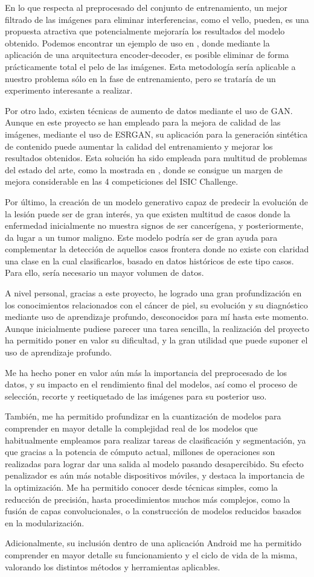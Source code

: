 En lo que respecta al preprocesado del conjunto de entrenamiento, un mejor filtrado de las imágenes para eliminar interferencias, como el vello,  pueden, es una propuesta atractiva que potencialmente mejoraría los resultados del modelo obtenido. Podemos encontrar un ejemplo de uso en \cite{9306830}, donde mediante la aplicación de una arquitectura encoder-decoder, es posible eliminar de forma prácticamente total el pelo de las imágenes. Esta metodología sería aplicable a nuestro problema sólo en la fase de entrenamiento, pero se trataría de un experimento interesante a realizar.

Por otro lado, existen técnicas de aumento de datos mediante el uso de GAN. Aunque en este proyecto se han empleado para la mejora de calidad de las imágenes, mediante el uso de ESRGAN, su aplicación para la generación sintética de contenido puede aumentar la calidad del entrenamiento y mejorar los resultados obtenidos.  Esta solución ha sido empleada para multitud de problemas del estado del arte, como la mostrada en \cite{ganskincancer}, donde se consigue un margen de mejora considerable en las 4 competiciones del ISIC Challenge.

Por último, la creación de un modelo generativo capaz de predecir la evolución de la lesión puede ser de gran interés, ya que existen multitud de casos donde la enfermedad inicialmente no muestra signos de ser cancerígena, y posteriormente, da lugar a un tumor maligno. Este modelo podría ser de gran ayuda para complementar la detección de aquellos casos frontera donde no existe con claridad una clase en la cual clasificarlos, basado en datos históricos de este tipo casos. Para ello, sería necesario un mayor volumen de datos.

A nivel personal, gracias a este proyecto, he logrado una gran profundización en los conocimientos relacionados con el cáncer de piel, su evolución y su diagnóstico mediante uso de aprendizaje profundo, desconocidos para mí hasta este momento. Aunque inicialmente pudiese parecer una tarea sencilla, la realización del proyecto ha permitido poner en valor su dificultad, y la gran utilidad que puede suponer el uso de aprendizaje profundo.

Me ha hecho poner en valor aún más la importancia del preprocesado de los datos, y su impacto en el rendimiento final del modelos, así como el proceso de selección, recorte y reetiquetado de las imágenes para su posterior uso.

También, me ha permitido profundizar en la cuantización de modelos para comprender en mayor detalle la complejidad real de los modelos que habitualmente empleamos para realizar tareas de clasificación y segmentación, ya que gracias a  la potencia de cómputo actual, millones de operaciones son realizadas para lograr dar una salida al modelo pasando desapercibido. Su efecto penalizador es aún más notable dispositivos móviles, y destaca la importancia de la optimización. Me ha permitido conocer desde técnicas simples, como la reducción de precisión, hasta procedimientos muchos más complejos, como la fusión de capas convolucionales, o la construcción de modelos reducidos basados en la modularización.

Adicionalmente, su inclusión dentro de una aplicación Android me ha permitido comprender en mayor detalle su funcionamiento y el ciclo de vida de la misma,  valorando los distintos métodos y herramientas aplicables. 


